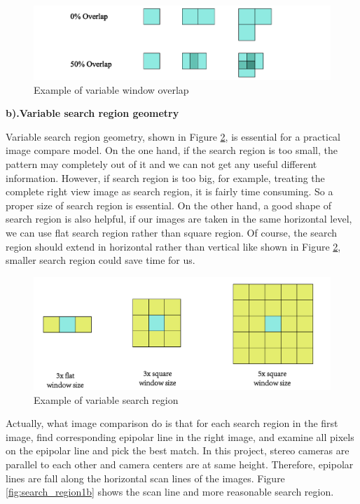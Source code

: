 \begin{figure}[h!]
	\centering
	\includegraphics[width=0.8\linewidth]{figures/part2/window_overlap}
	\caption{Example of variable window overlap}
	\label{fig:window_overlap}
\end{figure}

\textbf{b).Variable search region geometry}

Variable search region geometry, shown in Figure \ref{fig:search_region}, is essential for a practical image compare model. On the one hand, if the search region is too small, the pattern may completely out of it and we can not get any useful different information. However, if search region is too big, for example, treating the complete right view image as search region, it is fairly time consuming. So a proper size of search region is essential. On the other hand, a good shape of search region is also helpful, if our images are taken in the same horizontal level, we can use flat search region rather than square region. Of course, the search region should extend in horizontal rather than vertical like shown in Figure \ref{fig:search_region}, smaller search region could save time for us.

\begin{figure}[h!]
	\centering
	\includegraphics[width=0.8\linewidth]{figures/part2/search_region}
	\caption{Example of variable search region}
	\label{fig:search_region}
\end{figure}

Actually, what image comparison do is that for each search region in the first image, find corresponding epipolar line in the right image, and examine all pixels on the epipolar line and pick the best match. In this project, stereo cameras are parallel to each other and camera centers are at same height. Therefore, epipolar lines are fall along the horizontal scan lines of the images. Figure \ref{fig:search_region1b} shows the scan line and more reasonable search region.

